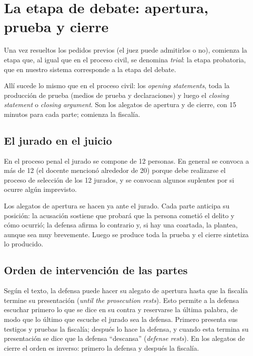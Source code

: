 \documentclass[12pt,oneside]{book}
\begin{document}
\section{La etapa de debate: apertura, prueba y cierre}

Una vez resueltos los pedidos previos (el juez puede admitirlos o no), comienza la etapa que, al igual que en el proceso civil, se denomina \textit{trial}: la etapa probatoria, que en nuestro sistema corresponde a la etapa del debate.

Allí sucede lo mismo que en el proceso civil: los \textit{opening statements}, toda la producción de prueba (medios de prueba y declaraciones) y luego el \textit{closing statement} o \textit{closing argument}. Son los alegatos de apertura y de cierre, con 15 minutos para cada parte; comienza la fiscalía.

\subsection{El jurado en el juicio}

En el proceso penal el jurado se compone de 12 personas. En general se convoca a más de 12 (el docente mencionó alrededor de 20) porque debe realizarse el proceso de selección de los 12 jurados, y se convocan algunos suplentes por si ocurre algún imprevisto.

Los alegatos de apertura se hacen ya ante el jurado. Cada parte anticipa su posición: la acusación sostiene que probará que la persona cometió el delito y cómo ocurrió; la defensa afirma lo contrario y, si hay una coartada, la plantea, aunque sea muy brevemente. Luego se produce toda la prueba y el cierre sintetiza lo producido.

\subsection{Orden de intervención de las partes}

Según el texto, la defensa puede hacer su alegato de apertura hasta que la fiscalía termine su presentación (\textit{until the prosecution rests}). Esto permite a la defensa escuchar primero lo que se dice en su contra y reservarse la última palabra, de modo que lo último que escuche el jurado sea la defensa. Primero presenta sus testigos y pruebas la fiscalía; después lo hace la defensa, y cuando esta termina su presentación se dice que la defensa ``descansa'' (\textit{defense rests}). En los alegatos de cierre el orden es inverso: primero la defensa y después la fiscalía.
\end{document}
